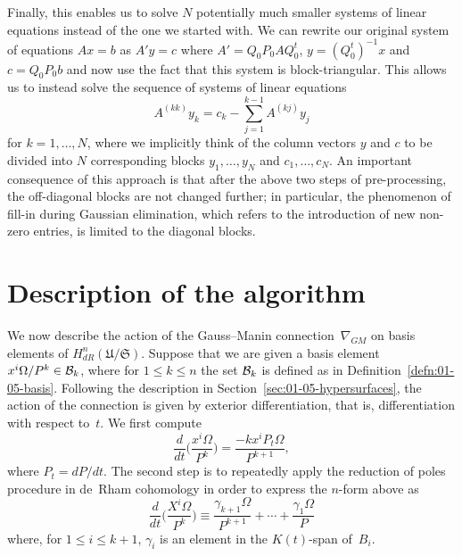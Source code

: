 Finally, this enables us to solve $N$ potentially much smaller systems of 
linear equations instead of the one we started with.  We can rewrite our 
original system of equations $Ax = b$ as $A' y = c$ where 
$A' = Q_0 P_0 A Q_0^t$, $y = (Q_0^t)^{-1} x$ and $c = Q_0 P_0 b$ and now use 
the fact that this system is block-triangular.  This allows us to instead 
solve the sequence of systems of linear equations 
\begin{equation}
A^{(kk)} y_k = c_k - \sum_{j=1}^{k-1} A^{(kj)} y_j
\end{equation}
for $k = 1, \dotsc, N$, where we implicitly think of the column vectors $y$ 
and $c$ to be divided into $N$ corresponding blocks $y_1, \dotsc, y_N$ and 
$c_1, \dotsc, c_N$.  An important consequence of this approach is that after 
the above two steps of pre-processing, the off-diagonal blocks are not changed 
further;  in particular, the phenomenon of fill-in during Gaussian 
elimination, which refers to the introduction of new non-zero entries, is 
limited to the diagonal blocks.


\section{Description of the algorithm}

We now describe the action of the Gauss--Manin connection~$\nabla_{GM}$ on 
basis elements of $H_{dR}^n(\mathfrak{U}/\mathfrak{S})$.  Suppose that we are 
given a basis element $x^i \Omega / P^k \in \mathcal{B}_k$, where for 
$1 \leq k \leq n$ the set $\mathcal{B}_k$ is defined as in 
Definition~\ref{defn:01-05-basis}.  Following the description in 
Section~\ref{sec:01-05-hypersurfaces}, the action of the connection 
is given by exterior differentiation, that is, differentiation with respect 
to~$t$.  We first compute 
\begin{equation*}
\frac{d}{dt} \biggl(\frac{x^i \Omega}{P^k}\biggr) = \frac{-k x^i P_t \Omega}{P^{k+1}},
\end{equation*}
where $P_t = dP/dt$.  The second step is to repeatedly apply the reduction of 
poles procedure in de~Rham cohomology in order to express the $n$-form above 
as 
\begin{equation*}
\frac{d}{dt} \biggl(\frac{X^i \Omega}{P^k}\biggr) \equiv 
    \frac{\gamma_{k+1} \Omega}{P^{k+1}} + \dotsb + \frac{\gamma_1 \Omega}{P}
\end{equation*}
where, for $1 \leq i \leq k+1$, $\gamma_i$ is an element in the $K(t)$-span 
of~$B_i$.

